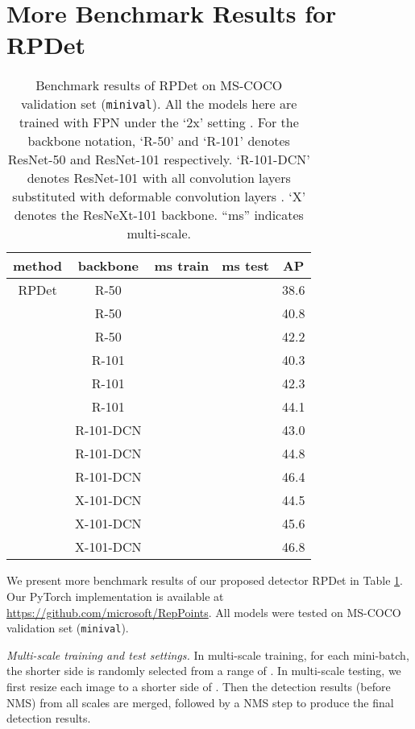 \documentclass[10pt,twocolumn,letterpaper]{article}
\begin{document}
\section{More Benchmark Results for RPDet}
\begin{table}[tb]
	\begin{center}
	\begin{tabular}{c|c|c|c|c}
	\hline
	method & backbone & ms train & ms test & AP \\
	\hline
	\hline
	RPDet & R-50 & & & 38.6 \\
	\hline
	& R-50 & \checkmark & & 40.8 \\
	\hline
	& R-50 & \checkmark & \checkmark & 42.2 \\
	\hline
	\hline
	& R-101 & & & 40.3 \\
	\hline
	& R-101 & \checkmark & & 42.3 \\
	\hline
	& R-101 & \checkmark & \checkmark & 44.1 \\
	\hline
	\hline
	& R-101-DCN & & & 43.0 \\
	\hline
	& R-101-DCN & \checkmark & & 44.8 \\
	\hline
	& R-101-DCN & \checkmark & \checkmark & 46.4 \\
	\hline
	\hline
	& X-101-DCN & & & 44.5 \\
	\hline
	& X-101-DCN & \checkmark & & 45.6 \\
	\hline
	& X-101-DCN & \checkmark & \checkmark & 46.8 \\
	\hline
	\end{tabular}
	\end{center}
\caption{Benchmark results of RPDet on MS-COCO \cite{MSCOCO} validation set (\texttt{minival}). All the models here are trained with FPN \cite{FPN} under the `2x' setting \cite{Detectron2018}. For the backbone notation, `R-50' and `R-101' denotes ResNet-50 and ResNet-101 \cite{ResNet} respectively. `R-101-DCN' denotes ResNet-101 with all convolution layers substituted with deformable convolution layers \cite{DCN}. `X' denotes the ResNeXt-101 \cite{ResNeXt} backbone. ``ms'' indicates multi-scale. }
\label{tab::benchmark}
\end{table}

 
We present more benchmark results of our proposed detector RPDet in Table \ref{tab::benchmark}. Our PyTorch implementation is available at \href{https://github.com/microsoft/RepPoints}{https://github.com/microsoft/RepPoints}. All models were tested on MS-COCO \cite{MSCOCO} validation set (\texttt{minival}). 

\noindent \emph{Multi-scale training and test settings.} In multi-scale training, for each mini-batch, the shorter side is randomly selected from a range of . In multi-scale testing, we first resize each image to a shorter side of . Then the detection results (before NMS) from all scales are merged, followed by a NMS step to produce the final detection results.

 
\end{document}
